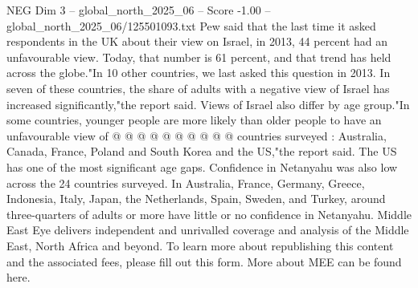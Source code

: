 \begin{textsample}{NEG Dim 3 – global\_north\_2025\_06 – Score -1.00 – global\_north\_2025\_06/125501093.txt}
Pew said that the last time it asked respondents in the UK about their view on Israel, in 2013, 44 percent had an unfavourable view.
Today, that number is 61 percent, and that trend has held across the globe."In 10 other countries, we last asked this question in 2013.
In seven of these countries, the share of adults with a negative view of Israel has increased significantly,"the report said.
Views of Israel also differ by age group."In some countries, younger people are more likely than older people to have an unfavourable view of @ @ @ @ @ @ @ @ @ @ countries surveyed : Australia, Canada, France, Poland and South Korea and the US,"the report said.
The US has one of the most significant age gaps.
Confidence in Netanyahu was also low across the 24 countries surveyed.
In Australia, France, Germany, Greece, Indonesia, Italy, Japan, the Netherlands, Spain, Sweden, and Turkey, around three-quarters of adults or more have little or no confidence in Netanyahu.
Middle East Eye delivers independent and unrivalled coverage and analysis of the Middle East, North Africa and beyond.
To learn more about republishing this content and the associated fees, please fill out this form.
More about MEE can be found here.

\end{textsample}
